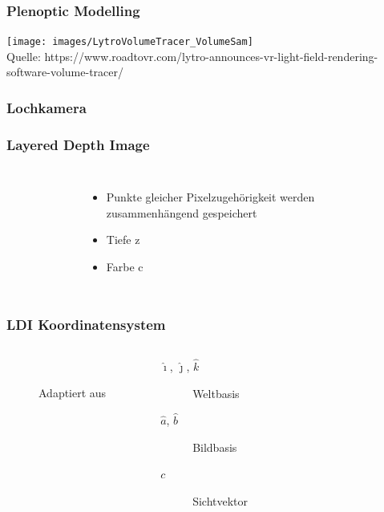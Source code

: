 \documentclass[aspectratio=169]{beamer}
\begin{document}
\begin{frame}
    \frametitle{Plenoptic Modelling}
    \centering
    \texttt{[image: images/LytroVolumeTracer\_VolumeSam]}
    \\[-1ex]{\tiny Quelle: https://www.roadtovr.com/lytro-announces-vr-light-field-rendering-software-volume-tracer/}
\end{frame}

\begin{frame}
    \frametitle{Lochkamera}
    \begin{figure}
        \centering
        \resizebox{.8\linewidth}{!}{}%
        \label{fig:pinholecamera}
    \end{figure}
\end{frame}

\begin{frame}
    \frametitle{Layered Depth Image}
    \begin{columns}
        \begin{figure}
            \centering
            \resizebox{\linewidth}{!}{}%
            \label{fig:layereddepthimage}
        \end{figure}

    \begin{itemize}
        \item Punkte gleicher Pixelzugehörigkeit werden zusammenhängend gespeichert
        \item Tiefe z
        \item Farbe c
    \end{itemize}
    \end{columns}
\end{frame}

\begin{frame}
    \frametitle{LDI Koordinatensystem}
    \begin{columns}
        \begin{figure}
            \centering
            \resizebox{\linewidth}{!}{}
            \\[-1ex]{\tiny Adaptiert aus~\cite{mcmillan1997image}}%
            \label{fig:ldicoord}
        \end{figure}
    
    \begin{description}
        \item[\(\hat{\imath}\), \( \hat{\jmath} \), \( \hat{k} \)] Weltbasis
        \item[\( \hat{a} \), \( \hat{b} \)] Bildbasis
        \item[\( c \)] Sichtvektor
    \end{description}
    \end{columns}
\end{frame}
\end{document}
